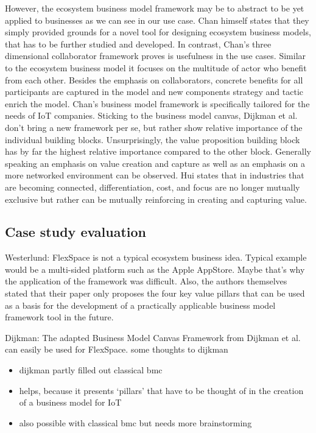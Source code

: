 	However, the ecosystem business model framework may be to abstract to be yet applied to businesses as we can see in our use case. Chan himself states that they simply provided grounds for a novel tool for designing ecosystem business models, that has to be further studied and developed. In contrast, Chan's three dimensional collaborator framework proves is usefulness in the use cases. Similar to the ecosystem business model it focuses on the multitude of actor who benefit from each other. Besides the emphasis on collaborators, concrete benefits for all participants are captured in the model and new components strategy and tactic enrich the model. Chan's  business model framework is specifically tailored for the needs of IoT companies. Sticking to the business model canvas, Dijkman et al. \cite{dijkman} don't bring a new framework per se, but rather show relative importance of the individual building blocks. Unsurprisingly, the value proposition building block has by far the highest relative importance compared to the other block. Generally speaking an emphasis on value creation and capture as well as an emphasis on a more networked environment can be observed. Hui \cite{hui} states that in industries that are becoming connected, differentiation, cost, and focus are no longer mutually exclusive but rather can be mutually reinforcing in creating and capturing value.
	\subsection{Case study evaluation}


	Westerlund: FlexSpace is not a typical ecosystem business idea. Typical example would be a multi-sided platform such as the Apple AppStore. Maybe that's why the application of the framework was difficult. Also, the authors themselves stated that their paper only proposes the four key value pillars that can be used as a basis for the development of a practically applicable business model framework tool in the future.

	Dijkman: The adapted Business Model Canvas Framework from Dijkman et al. can easily be used for FlexSpace.
	some thoughts to dijkman 
			\begin{itemize}
				\item dijkman partly filled out classical bmc
				\item helps, because it presents `pillars' that have to be thought of in the creation of a business model for IoT
				\item also possible with classical bmc but needs more brainstorming
			\end{itemize}
	

